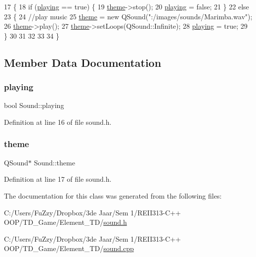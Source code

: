 \begin{DoxyCode}
17 \{
18     \textcolor{keywordflow}{if} (\hyperlink{class_sound_a8651994f1462748b66bb224e4404c1c0}{playing} == \textcolor{keyword}{true}) \{
19         \hyperlink{class_sound_a65c0e423d9a706534ed44f4383b5abc1}{theme}->stop();
20         \hyperlink{class_sound_a8651994f1462748b66bb224e4404c1c0}{playing} = \textcolor{keyword}{false};
21     \}
22     \textcolor{keywordflow}{else}
23     \{
24         \textcolor{comment}{//play music}
25         \hyperlink{class_sound_a65c0e423d9a706534ed44f4383b5abc1}{theme} = \textcolor{keyword}{new} QSound(\textcolor{stringliteral}{":/images/sounds/Marimba.wav"});
26         \hyperlink{class_sound_a65c0e423d9a706534ed44f4383b5abc1}{theme}->play();
27         \hyperlink{class_sound_a65c0e423d9a706534ed44f4383b5abc1}{theme}->setLoops(QSound::Infinite);
28         \hyperlink{class_sound_a8651994f1462748b66bb224e4404c1c0}{playing} = \textcolor{keyword}{true};
29     \}
30 
31 
32 
33 
34 \}
\end{DoxyCode}


\subsection{Member Data Documentation}
\mbox{\label{class_sound_a8651994f1462748b66bb224e4404c1c0}} 
\subsubsection{\texorpdfstring{playing}{playing}}
{\footnotesize\ttfamily bool Sound\+::playing\hspace{0.3cm}{\ttfamily [private]}}



Definition at line 16 of file sound.\+h.

\mbox{\label{class_sound_a65c0e423d9a706534ed44f4383b5abc1}} 
\subsubsection{\texorpdfstring{theme}{theme}}
{\footnotesize\ttfamily Q\+Sound$\ast$ Sound\+::theme\hspace{0.3cm}{\ttfamily [private]}}



Definition at line 17 of file sound.\+h.



The documentation for this class was generated from the following files\+:\begin{DoxyCompactItemize}
\item 
C\+:/\+Users/\+Fu\+Zzy/\+Dropbox/3de Jaar/\+Sem 1/\+R\+E\+I\+I313-\/\+C++ O\+O\+P/\+T\+D\+\_\+\+Game/\+Element\+\_\+\+T\+D/\hyperlink{sound_8h}{sound.\+h}\item 
C\+:/\+Users/\+Fu\+Zzy/\+Dropbox/3de Jaar/\+Sem 1/\+R\+E\+I\+I313-\/\+C++ O\+O\+P/\+T\+D\+\_\+\+Game/\+Element\+\_\+\+T\+D/\hyperlink{sound_8cpp}{sound.\+cpp}\end{DoxyCompactItemize}
